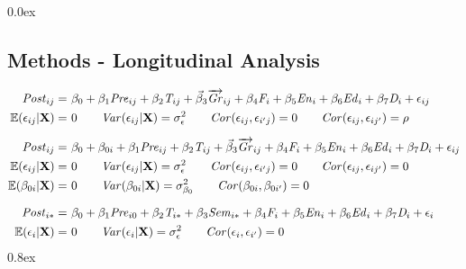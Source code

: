 \documentclass[a0,landscape]{a0poster}
\begin{document}
\begin{multicols}{3}
\parskip 0.0ex
\subsection*{Methods - Longitudinal Analysis}

\begin{align}
\mathit{Post}_{ij} = & ~ \beta_0 
                     + \beta_1 \mathit{Pre}_{ij}
                     + \beta_2 \mathit{T}_{ij}
                     + \vec\beta_{3} \overrightarrow{\mathit{Gr}}_{ij}
                     + \beta_4 \mathit{F}_{i}
                     + \beta_5 \mathit{En}_{i}
                     + \beta_6 \mathit{Ed}_{i}
                     + \beta_7 \mathit{D}_{i}
                     + \epsilon_{ij}
                     \label{eq:model1} \\
\mathbb{E}(\epsilon_{ij} | \mathbf{X} ) = & ~ 0 \nonumber \qquad
\mathit{Var}(\epsilon_{ij} | \mathbf{X} ) = \sigma^2_{\epsilon} \qquad
                    \mathit{Cor}(\epsilon_{ij}, \epsilon_{i'j}) = 0 \qquad
                    \mathit{Cor}(\epsilon_{ij}, \epsilon_{ij'}) = \rho \nonumber \\[1.5ex]
\mathit{Post}_{ij} = & ~ \beta_0 + \beta_{0i}
                     + \beta_1 \mathit{Pre}_{ij}
                     + \beta_2 \mathit{T}_{ij}
                     + \vec\beta_{3} \overrightarrow{\mathit{Gr}}_{ij}
                     + \beta_4 \mathit{F}_{i}
                     + \beta_5 \mathit{En}_{i}
                     + \beta_6 \mathit{Ed}_{i}
                     + \beta_7 \mathit{D}_{i}
                     + \epsilon_{ij}
                     \label{eq:model2} \\
\mathbb{E}(\epsilon_{ij} | \mathbf{X} ) = & ~ 0 \nonumber \qquad
\mathit{Var}(\epsilon_{ij} | \mathbf{X} ) = \sigma^2_{\epsilon} \qquad
                    \mathit{Cor}(\epsilon_{ij}, \epsilon_{i'j}) = 0 \qquad
                    \mathit{Cor}(\epsilon_{ij}, \epsilon_{ij'}) = 0 \nonumber \\
\mathbb{E}(\beta_{0i} | \mathbf{X} ) = & ~ 0 \nonumber \qquad
\mathit{Var}(\beta_{0i} | \mathbf{X} ) = \sigma^2_{\beta_0} \qquad
                    \mathit{Cor}(\beta_{0i}, \beta_{0i'}) = 0 \nonumber \\[1.5ex]
\mathit{Post}_{i*} = & ~ \beta_0
                     + \beta_1 \mathit{Pre}_{i0}
                     + \beta_2 \mathit{T}_{i*}
                     + \beta_3 \mathit{Sem}_{i*}
                     + \beta_4 \mathit{F}_{i}
                     + \beta_5 \mathit{En}_{i}
                     + \beta_6 \mathit{Ed}_{i}
                     + \beta_7 \mathit{D}_{i}
                     + \epsilon_{i}
                     \label{eq:model3} \\
\mathbb{E}(\epsilon_{i} | \mathbf{X} ) = & ~ 0 \nonumber \qquad
\mathit{Var}(\epsilon_{i} | \mathbf{X} ) = \sigma^2_{\epsilon} \qquad
                    \mathit{Cor}(\epsilon_{i}, \epsilon_{i'}) = 0  \nonumber
\end{align} 
\parskip 0.8ex


\end{multicols}
\end{document}
